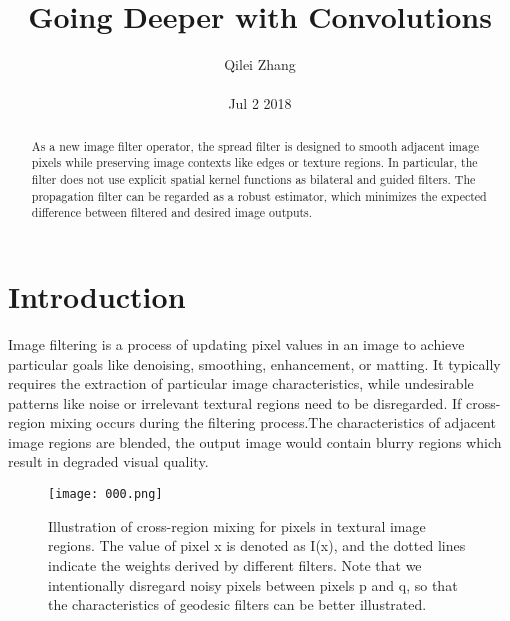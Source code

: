 \documentclass[30pt,twocolumn,letterpaper]{article}
\author{Qilei Zhang\\\\
Jul 2 2018}
\title{Going Deeper with Convolutions}
\begin{document}
\maketitle
\begin{abstract}
  As a new image filter operator, the spread filter is designed to smooth adjacent image pixels while preserving image contexts like edges or texture regions. In particular, the filter does not use explicit spatial kernel functions as bilateral and guided filters. The propagation filter can be regarded as a robust estimator, which minimizes the expected difference between filtered and desired image outputs.
\end{abstract}
\section{Introduction}
Image filtering is a process of updating pixel values in an image to achieve particular goals like denoising, smoothing, enhancement, or matting. It typically requires the extraction of particular image characteristics, while undesirable patterns like noise or irrelevant textural regions need to be disregarded. If cross-region mixing occurs during the filtering process.The characteristics of adjacent image regions are blended, the output image would contain blurry regions which result in degraded visual quality\cite{Gallin2013Going}. \\
\begin{figure}[htbp]
\small
\centering
\texttt{[image: 000.png]}
\caption{Illustration of cross-region mixing for pixels in
textural image regions. The value of pixel x is denoted as I(x),
and the dotted lines indicate the weights derived by different filters.
Note that we intentionally disregard noisy pixels between
pixels p and q, so that the characteristics of geodesic filters can be
better illustrated.
}
\label{fig:lable}
\end{figure}\\
\end{document}
